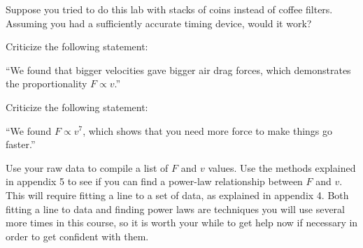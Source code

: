 \prelab

\prelabquestion Suppose you tried to do this lab with stacks of coins
instead of coffee filters. Assuming you had a sufficiently
accurate timing device, would it work?

\prelabquestion Criticize the following statement:

``We found that bigger velocities gave bigger air drag
forces, which demonstrates the proportionality $F\propto v$.''

\prelabquestion Criticize the following statement:

``We found $F\propto v^7$, which shows that you need more
force to make things go faster.''

\analysis

Use your raw data to compile a list of $F$ and $v$ values.
Use the methods explained in appendix 5  to see if you can
find a power-law relationship between $F$ and $v$. This will
require fitting a line to a set of data, as explained in
appendix 4. Both fitting a line to data and finding power
laws are techniques you will use several more times in this
course, so it is worth your while to get help now if
necessary in order to get confident with them.


